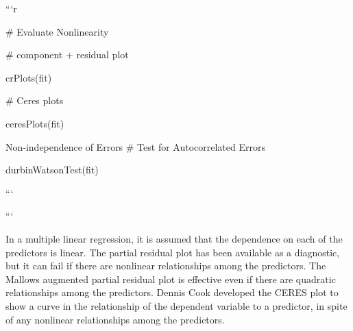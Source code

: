 ```{r}	
	

# Evaluate Nonlinearity

# component + residual plot 


crPlots(fit)


# Ceres plots 

ceresPlots(fit)


Non-independence of Errors
# 
Test for Autocorrelated Errors

durbinWatsonTest(fit)

```

```

In a multiple linear regression, it is assumed that the dependence on each of the predictors is linear. The partial residual plot has been available as a diagnostic, but it can fail if there are nonlinear relationships among the predictors. The Mallows augmented partial residual plot is effective even if there are quadratic relationships among the predictors. Dennis Cook developed the CERES plot to show a curve in the relationship of the dependent variable to a predictor, in spite of any nonlinear relationships among the predictors.

